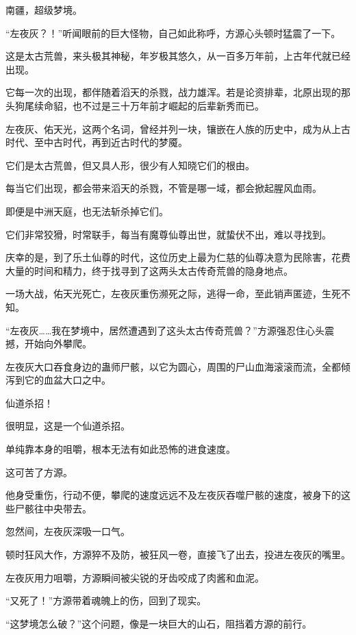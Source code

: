 
\begin{this_body}

南疆，超级梦境。

“左夜灰？！”听闻眼前的巨大怪物，自己如此称呼，方源心头顿时猛震了一下。

这是太古荒兽，来头极其神秘，年岁极其悠久，从一百多万年前，上古年代就已经出现。

它每一次的出现，都伴随着滔天的杀戮，战力雄浑。若是论资排辈，北原出现的那头狗尾续命貂，也不过是三十万年前才崛起的后辈新秀而已。

左夜灰、佑天光，这两个名词，曾经并列一块，镶嵌在人族的历史中，成为从上古时代、至中古时代，再到近古时代的梦魇。

它们是太古荒兽，但又具人形，很少有人知晓它们的根由。

每当它们出现，都会带来滔天的杀戮，不管是哪一域，都会掀起腥风血雨。

即便是中洲天庭，也无法斩杀掉它们。

它们非常狡猾，时常联手，每当有魔尊仙尊出世，就蛰伏不出，难以寻找到。

庆幸的是，到了乐土仙尊的时代，这位历史上最为仁慈的仙尊决意为民除害，花费大量的时间和精力，终于找寻到了这两头太古传奇荒兽的隐身地点。

一场大战，佑天光死亡，左夜灰重伤濒死之际，逃得一命，至此销声匿迹，生死不知。

“左夜灰……我在梦境中，居然遭遇到了这头太古传奇荒兽？”方源强忍住心头震撼，开始向外攀爬。

左夜灰大口吞食身边的蛊师尸骸，以它为圆心，周围的尸山血海滚滚而流，全都倾泻到它的血盆大口之中。

仙道杀招！

很明显，这是一个仙道杀招。

单纯靠本身的咀嚼，根本无法有如此恐怖的进食速度。

这可苦了方源。

他身受重伤，行动不便，攀爬的速度远远不及左夜灰吞噬尸骸的速度，被身下的这些尸骸往中央带去。

忽然间，左夜灰深吸一口气。

顿时狂风大作，方源猝不及防，被狂风一卷，直接飞了出去，投进左夜灰的嘴里。

左夜灰用力咀嚼，方源瞬间被尖锐的牙齿咬成了肉酱和血泥。

“又死了！”方源带着魂魄上的伤，回到了现实。

“这梦境怎么破？”这个问题，像是一块巨大的山石，阻挡着方源的前行。


\end{this_body}
